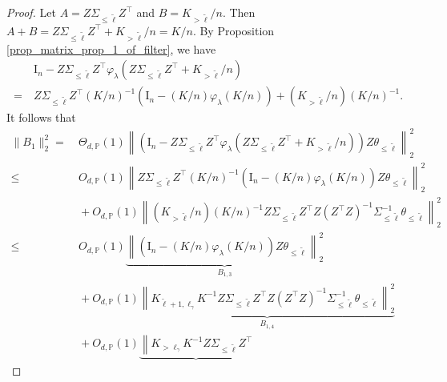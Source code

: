 \documentclass{article}
\theoremstyle{plain}
\theoremstyle{definition}
\theoremstyle{remark}
\newcommand{\reg}{\varphi_\lambda}
\begin{document}
\begin{appendix}
\begin{proof}
Let $A=Z \Sigma_{\leq \tilde{\ell}} Z^{\top}$ and $B=K_{>\tilde{\ell}} / n$. Then $A+B=Z \Sigma_{\leq \tilde{\ell}} Z^{\top}+K_{>\tilde{\ell}} / n=K/n$. 
By
Proposition \ref{prop_matrix_prop_1_of_filter}, we have 
\begin{equation}\label{eq:filter_implication}
\begin{aligned}
   &~ \mathrm{I}_n - Z\Sigma_{\leq \tilde{\ell}} Z^{\top} \reg(Z\Sigma_{\leq \tilde{\ell}} Z^{\top} +K_{>\tilde{\ell}}/n)\\
 =&~ Z\Sigma_{\leq \tilde{\ell}} Z^{\top} (K/n)^{-1}\left( \mathrm{I}_n - (K/n) \reg(K/n) \right)  + (K_{>\tilde{\ell}}/n) (K/n)^{-1}. 
\end{aligned}
 \end{equation}
It follows that
\begin{equation*}
\begin{aligned}
      \|B_1\|_{2}^{2}  =&~
      \Theta_{d, \mathbb{P}}\left(1\right)
        \left\| \left( \mathrm{I}_n - Z\Sigma_{\leq \tilde{\ell}} Z^{\top} \reg(Z\Sigma_{\leq \tilde{\ell}} Z^{\top} +K_{>\tilde{\ell}}/n) \right) 
                Z\theta_{\leq \tilde{\ell}} \right\|_{2}^{2}\\
        \leq &~
      O_{d, \mathbb{P}}\left(1\right)
        \left\| Z\Sigma_{\leq \tilde{\ell}} Z^{\top} (K/n)^{-1}\left( \mathrm{I}_n - (K/n) \reg(K/n) \right) 
                Z\theta_{\leq \tilde{\ell}} \right\|_{2}^{2}\\ 
                &~+  
                O_{d, \mathbb{P}}\left(  1\right)
                \left\| (K_{>\tilde{\ell}}/n) (K/n)^{-1} Z\Sigma_{\leq \tilde{\ell}} Z^{\top} 
                Z (Z^{\top} 
                Z)^{-1} \Sigma_{\leq \tilde{\ell}}^{-1} \theta_{\leq \tilde{\ell}} \right\|_{2}^{2}\\
                 \leq  &~  O_{d, \mathbb{P}}\left(1\right)
        \underbrace{\left\| \left( \mathrm{I}_n - (K/n) \reg(K/n) \right) 
                Z\theta_{\leq \tilde{\ell}} \right\|_{2}^{2}}_{B_{1,3}}\\ 
                &~+
                O_{d, \mathbb{P}}\left(  1\right)
                \underbrace{\left\| K_{\tilde{\ell}+1, \ell_{\gamma}} K^{-1} Z\Sigma_{\leq \tilde{\ell}} Z^{\top}
                Z (Z^{\top} 
                Z)^{-1} \Sigma_{\leq \tilde{\ell}}^{-1} \theta_{\leq \tilde{\ell}} \right\|_{2}^{2}}_{B_{1,4}}\\
                &~+
                O_{d, \mathbb{P}}\left(  1\right)
                \underbrace{\left\| K_{>\ell_{\gamma}} K^{-1} Z\Sigma_{\leq \tilde{\ell}} Z^{\top}
}
\end{aligned}
\end{equation*}
\end{proof}
\end{appendix}
\end{document}
